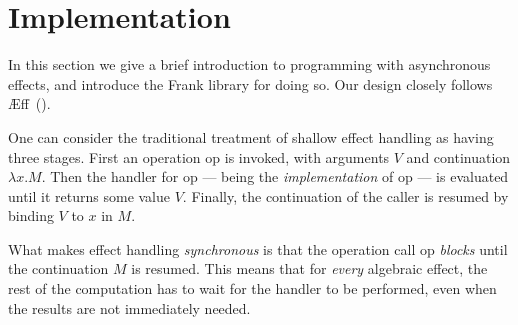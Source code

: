 \documentclass[msc,deptreport,cs]{infthesis} %
\newcommand\aeff{{\AE}ff\xspace}
\newcommand\nondetfrank{$\mathbb{F}_{\cal{ND}}$}
\newcommand\countingfrank{$\mathbb{F}_{\cal{C}}$}
\newcommand{\todo}[1]
           {{\par\noindent\small\color{RoyalPurple}
  \framebox{\parbox{\dimexpr\linewidth-2\fboxsep-2\fboxrule}
    {\textbf{TODO:} #1}}}}
\newcommand{\sigentails}[1]{\mathbin{[{\text{\scriptsize ${#1}$}}]\hspace{-0.4ex}\text{-\!-}}\,}
\newcommand{\inferbase}[5]{#1; #3 \mathbin{#2} {#4} \Rightarrow {#5}}
\newcommand{\checkbase}[5]{#1; #3 \mathbin{#2} #5 \mathbin{:} #4}
\newcommand{\makes}[5]{\inferbase{#1}{\sigentails{#3}}{#2}{#4}{#5}}
\newcommand{\has}[5]{\checkbase{#1}{\sigentails{#3}}{#2}{#4}{#5}}
\newcommand{\infers}{\makes}
\newcommand{\checks}{\has}
\newcommand{\sigs}{\Sigma}
\begin{document}







\chapter{Implementation}
\label{chap:implementation}


In this section we give a brief introduction to programming with asynchronous
effects, and introduce the Frank library for doing so.
%
Our design closely follows \aeff~(\cite{ahman2020asynchronous}).

One can consider the traditional treatment of shallow effect handling as having
three stages. First an operation \textsf{op} is invoked, with arguments $V$ and
continuation $\lambda x . M$. Then the handler for \textsf{op} --- being the
\emph{implementation} of \textsf{op} --- is evaluated until it returns some
value $V$. Finally, the continuation of the caller is resumed by binding $V$ to
$x$ in $M$.


What makes effect handling \emph{synchronous} is that the operation call
\textsf{op} \emph{blocks} until the continuation $M$ is resumed. This means that
for \emph{every} algebraic effect, the rest of the computation has to wait for
the handler to be performed, even when the results are not immediately needed.
\end{document}
